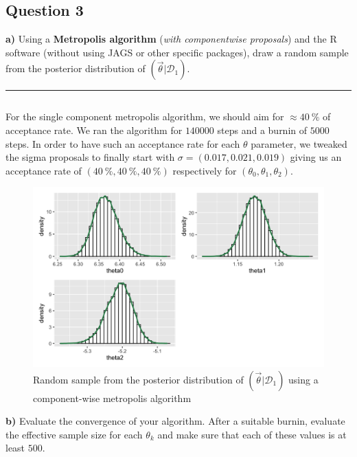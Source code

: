 \subsection*{Question 3}

\textbf{a)} Using a \textbf{Metropolis algorithm} (\textit{with componentwise proposals}) and the R software (without using JAGS or other specific packages), draw a random sample from the posterior distribution of $(\vec{\theta}|\mathcal{D}_1)$.

\begin{center}\rule{6cm}{0.4pt}\end{center}

\inputminted[breaklines]{r}{code/q3a.r}

For the single component metropolis algorithm, we should aim for $\approx \SI{40}{\percent}$ of acceptance rate. We ran the algorithm for $\num{140000}$ steps and a burnin of $\num{5000}$ steps. In order to have such an acceptance rate for each $\theta$ parameter, we tweaked the sigma proposals to finally start with $\sigma = (0.017, 0.021, 0.019)$ giving us an acceptance rate of $(\SI{40}{\percent}, \SI{40}{\percent}, \SI{40}{\percent})$ respectively for $(\theta_0, \theta_1, \theta_2)$.

\begin{figure}[H]
	\centering
	\includegraphics{figures/metropolis_cw/metropolis_cw_samples.png}
	\caption{Random sample from the posterior distribution of $(\vec{\theta}|\mathcal{D}_1)$ using a component-wise metropolis algorithm}
	\label{fig:metropolis_cw_samples}
\end{figure}

\textbf{b)} Evaluate the convergence of your algorithm. After a suitable burnin, evaluate the effective sample size for each $\theta_k$ and make sure that each of these values is at least $500$.


